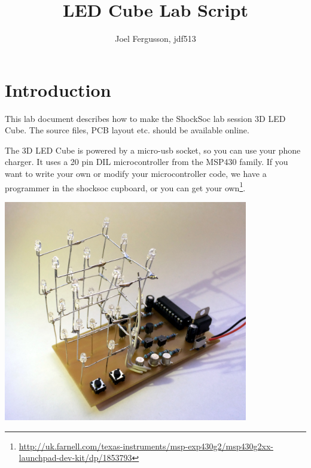 \documentclass{article}
\title{LED Cube Lab Script}
\author{Joel Fergusson, jdf513}
\begin{document}
\maketitle
\section{Introduction}
This lab document describes how to make the ShockSoc lab session 3D LED
Cube. The source files, PCB layout etc. should be available online.

The 3D LED Cube is powered by a micro-usb socket, so you can use your 
phone charger. It uses a 20 pin DIL microcontroller from the MSP430 
family. If you want to write your own or modify your microcontroller 
code, we have a programmer in the shocksoc cupboard, or you can get your 
own\footnote{\url{http://uk.farnell.com/texas-instruments/msp-exp430g2/msp430g2xx-launchpad-dev-kit/dp/1853793}}.


\centerline{
\includegraphics[width=0.8\textwidth]{photo_of_cube.JPG}
}
\end{document}
